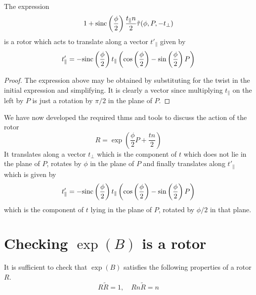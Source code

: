 \begin{lemma}
The expression
\[
 1 + \mathrm{sinc}\left(\frac{\phi}{2}\right)\frac{t_\parallel n}{2} \tilde{\tau}(\phi, P, - t_\perp)
\]
is a rotor which acts to translate along a vector $t'_\parallel$ given by
\[
t'_\parallel = - \mathrm{sinc}\left(\frac{\phi}{2}\right)
t_\parallel
\left(
\cos\left(\frac{\phi}{2}\right) -
\sin\left(\frac{\phi}{2}\right) P 
\right)
\]
\end{lemma}
\begin{proof}
The expression above may be obtained by substituting for the twist in the initial expression and simplifying. 
It is clearly a vector since multiplying $t_\parallel$ on the left by $P$ is just a rotation by $\pi / 2$ in the plane
of $P$.
\end{proof}

We have now developed the required thms and tools to discuss the
action of the rotor
\[
R = \exp\left(
\frac{\phi}{2} P + \frac{tn}{2}
\right)
\]
It translates along a vector $t_\perp$ which is the component of $t$ which does not lie in the
plane of $P$, rotates by $\phi$ in the plane of $P$ and finally translates along 
$t'_\parallel$ which is given by
\[
t'_\parallel =- \mathrm{sinc}\left(\frac{\phi}{2}\right)
t_\parallel
\left(
\cos\left(\frac{\phi}{2}\right) -
\sin\left(\frac{\phi}{2}\right) P 
\right)
\]
which is the component of $t$ lying in the
plane of $P$, rotated by $\phi/2$ in that plane.

\section{Checking $\exp(B)$ is a rotor}

It is sufficient to check that $\exp(B)$ satisfies the following
properties of a rotor $R$. %
\[
R\tilde{R} = 1, \quad Rn\tilde{R} = n
\]

